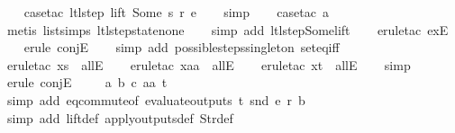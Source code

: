 \begin{isabellebody}
%
\isadelimproof
\ \ %
\endisadelimproof
%
\isatagproof
{}\isamarkupfalse%
\ {\isacharparenleft}case{\isacharunderscore}tac\ {\isachardoublequoteopen}ltl{\isacharunderscore}step\ lift\ {\isacharparenleft}Some\ s{\isacharparenright}\ r\ e{\isachardoublequoteclose}{\isacharparenright}\isanewline
\ \ \isamarkupfalse%
\ simp\isanewline
\ \ \isamarkupfalse%
\ {\isacharparenleft}case{\isacharunderscore}tac\ a{\isacharparenright}\isanewline
\ \ \ \isamarkupfalse%
\ {\isacharparenleft}metis\ list{\isachardot}simps{\isacharparenleft}{}{\isacharparenright}\ ltl{\isacharunderscore}step{\isacharunderscore}state{\isacharunderscore}none{\isacharparenright}\isanewline
\ \ \isamarkupfalse%
\ {\isacharparenleft}simp\ add{\isacharcolon}\ ltl{\isacharunderscore}step{\isacharunderscore}Some{\isacharunderscore}lift{\isacharparenright}\isanewline
\ \ \isamarkupfalse%
\ {\isacharparenleft}erule{\isacharunderscore}tac\ exE{\isacharparenright}\isanewline
\ \ \isamarkupfalse%
\ {\isacharparenleft}erule\ conjE{\isacharparenright}{\isacharplus}\isanewline
\ \ \isamarkupfalse%
\ {\isacharparenleft}simp\ add{\isacharcolon}\ possible{\isacharunderscore}steps{\isacharunderscore}singleton\ set{\isacharunderscore}eq{\isacharunderscore}iff{\isacharparenright}\isanewline
\ \ \isamarkupfalse%
\ {\isacharparenleft}erule{\isacharunderscore}tac\ x{\isacharequal}s\ \ allE{\isacharparenright}\isanewline
\ \ \isamarkupfalse%
\ {\isacharparenleft}erule{\isacharunderscore}tac\ x{\isacharequal}aa\ \ allE{\isacharparenright}\isanewline
\ \ \isamarkupfalse%
\ {\isacharparenleft}erule{\isacharunderscore}tac\ x{\isacharequal}t\ \ allE{\isacharparenright}\isanewline
\ \ \isamarkupfalse%
\ simp\isanewline
\ \ \isamarkupfalse%
\ {\isacharparenleft}erule\ conjE{\isacharparenright}{\isacharplus}\isanewline
\ \ \isamarkupfalse%
\ \ a\ b\ c\ aa\ t\isanewline
\ \ \ \ \isamarkupfalse%
\ {\isacharparenleft}simp\ add{\isacharcolon}\ eq{\isacharunderscore}commute{\isacharbrackleft}of\ {\isachardoublequoteopen}evaluate{\isacharunderscore}outputs\ t\ {\isacharparenleft}snd\ e{\isacharparenright}\ r{\isachardoublequoteclose}\ b{\isacharbrackright}{\isacharparenright}\isanewline
\ \ \ \ \isamarkupfalse%
\ {\isacharparenleft}simp\ add{\isacharcolon}\ lift{\isacharunderscore}def\ apply{\isacharunderscore}outputs{\isacharunderscore}def\ Str{\isacharunderscore}def{\isacharparenright}\isanewline

\end{isabellebody}
